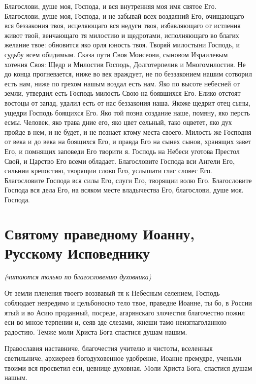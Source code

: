 Благослови, душе моя, Господа, и вся внутренняя моя имя святое Его. Благослови, душе моя, Господа, и не забывай всех воздаяний Его, очищающаго вся беззакония твоя, исцеляющаго вся недуги твоя, избавляющаго от истления живот твой, венчающаго тя милостию и щедротами, исполняющаго во благих желание твое: обновится яко орля юность твоя. Творяй милостыни Господь, и судьбу всем обидимым. Сказа пути Своя Моисеови, сыновом Израилевым хотения Своя: Щедр и Милостив Господь, Долготерпелив и Многомилостив. Не до конца прогневается, ниже во век враждует, не по беззаконием нашим сотворил есть нам, ниже по грехом нашым воздал есть нам. Яко по высоте небесней от земли, утвердил есть Господь милость Свою на боявшихся Его. Елико отстоят востоцы от запад, удалил есть от нас беззакония наша. Якоже щедрит отец сыны, ущедри Господь боящихся Его. Яко той позна создание наше, помяну, яко персть есмы. Человек, яко трава дние его, яко цвет сельный, тако оцветет, яко дух пройде в нем, и не будет, и не познает ктому места своего. Милость же Господня от века и до века на боящихся Его, и правда Его на сынех сынов, хранящих завет Его, и помнящих заповеди Его творити я. Господь на Небеси уготова Престол Свой, и Царство Его всеми обладает. Благословите Господа вси Ангели Его, сильнии крепостию, творящии слово Его, услышати глас словес Его. Благословите Господа вся силы Его, слуги Его, творящии волю Его. Благословите Господа вся дела Его, на всяком месте владычества Его, благослови, душе моя. Господа.


\section{Святому праведному Иоанну, Русскому Исповеднику}
 


\itshape (читаются только по благословению духовника)\normalfont{}




От земли пленения твоего воззвавый тя к Небесным селением, Господь соблюдает невредимо и цельбоносно тело твое, праведне Иоанне, ты бо, в России ятый и во Асию проданный, посреде, агарянскаго злочестия благочестно пожил еси во мнозе терпении и, сеяв зде слезами, жнеши тамо неизглаголанною радостию. Темже моли Христа Бога спастися душам нашим.




Православия наставниче, благочестия учителю и чистоты, вселенныя светильниче, архиереев  богодуховенное удобрение, Иоанне  премудре, ученьми твоими вся просветил еси, цевнице духовная. Mоли Христа Бога, спастися душам нашым.


